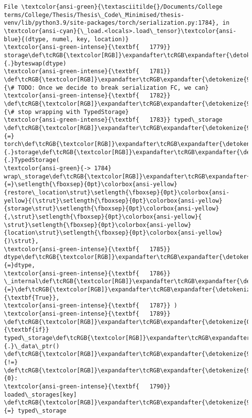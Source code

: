\documentclass[11pt]{article}
\begin{document}
\begin{Verbatim}[commandchars=\\\{\}, frame=single, framerule=2mm, rulecolor=\color{outerrorbackground}]
File \textcolor{ansi-green}{\textasciitilde{}/Documents/College terms/College/Thesis/Thesis\_Code\_Minimised/thesis-venv/lib/python3.9/site-packages/torch/serialization.py:1784}, in \textcolor{ansi-cyan}{\_load.<locals>.load\_tensor}\textcolor{ansi-blue}{(dtype, numel, key, location)}
\textcolor{ansi-green-intense}{\textbf{   1779}}         storage\def\tcRGB{\textcolor[RGB]}\expandafter\tcRGB\expandafter{\detokenize{98,98,98}}{.}byteswap(dtype)
\textcolor{ansi-green-intense}{\textbf{   1781}} \def\tcRGB{\textcolor[RGB]}\expandafter\tcRGB\expandafter{\detokenize{95,135,135}}{\# TODO: Once we decide to break serialization FC, we can}
\textcolor{ansi-green-intense}{\textbf{   1782}} \def\tcRGB{\textcolor[RGB]}\expandafter\tcRGB\expandafter{\detokenize{95,135,135}}{\# stop wrapping with TypedStorage}
\textcolor{ansi-green-intense}{\textbf{   1783}} typed\_storage \def\tcRGB{\textcolor[RGB]}\expandafter\tcRGB\expandafter{\detokenize{98,98,98}}{=} torch\def\tcRGB{\textcolor[RGB]}\expandafter\tcRGB\expandafter{\detokenize{98,98,98}}{.}storage\def\tcRGB{\textcolor[RGB]}\expandafter\tcRGB\expandafter{\detokenize{98,98,98}}{.}TypedStorage(
\textcolor{ansi-green}{-> 1784}     wrap\_storage\def\tcRGB{\textcolor[RGB]}\expandafter\tcRGB\expandafter{\detokenize{98,98,98}}{=}\setlength{\fboxsep}{0pt}\colorbox{ansi-yellow}{restore\_location\strut}\setlength{\fboxsep}{0pt}\colorbox{ansi-yellow}{(\strut}\setlength{\fboxsep}{0pt}\colorbox{ansi-yellow}{storage\strut}\setlength{\fboxsep}{0pt}\colorbox{ansi-yellow}{,\strut}\setlength{\fboxsep}{0pt}\colorbox{ansi-yellow}{ \strut}\setlength{\fboxsep}{0pt}\colorbox{ansi-yellow}{location\strut}\setlength{\fboxsep}{0pt}\colorbox{ansi-yellow}{)\strut},
\textcolor{ansi-green-intense}{\textbf{   1785}}     dtype\def\tcRGB{\textcolor[RGB]}\expandafter\tcRGB\expandafter{\detokenize{98,98,98}}{=}dtype,
\textcolor{ansi-green-intense}{\textbf{   1786}}     \_internal\def\tcRGB{\textcolor[RGB]}\expandafter\tcRGB\expandafter{\detokenize{98,98,98}}{=}\def\tcRGB{\textcolor[RGB]}\expandafter\tcRGB\expandafter{\detokenize{0,135,0}}{\textbf{True}},
\textcolor{ansi-green-intense}{\textbf{   1787}} )
\textcolor{ansi-green-intense}{\textbf{   1789}} \def\tcRGB{\textcolor[RGB]}\expandafter\tcRGB\expandafter{\detokenize{0,135,0}}{\textbf{if}} typed\_storage\def\tcRGB{\textcolor[RGB]}\expandafter\tcRGB\expandafter{\detokenize{98,98,98}}{.}\_data\_ptr() \def\tcRGB{\textcolor[RGB]}\expandafter\tcRGB\expandafter{\detokenize{98,98,98}}{!=} \def\tcRGB{\textcolor[RGB]}\expandafter\tcRGB\expandafter{\detokenize{98,98,98}}{0}:
\textcolor{ansi-green-intense}{\textbf{   1790}}     loaded\_storages[key] \def\tcRGB{\textcolor[RGB]}\expandafter\tcRGB\expandafter{\detokenize{98,98,98}}{=} typed\_storage


\end{Verbatim}
\end{document}
